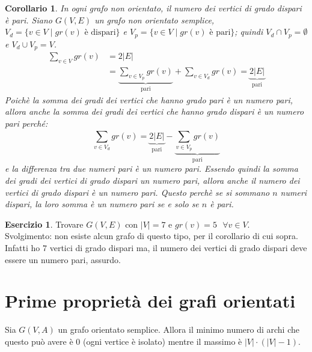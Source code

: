 \documentclass[a4paper, oneside, openany]{book}
\theoremstyle{plain}
\newtheorem{cor}[thm]{Corollario}
\theoremstyle{definition}
\newtheorem{eser}{Esercizio}[section]
\begin{document}
\begin{cor}
    In ogni grafo non orientato, il numero dei vertici di grado dispari è pari.
\proof
    Siano $G(V,E)$ un grafo non orientato semplice, ${V_d = \{v \in V \mid gr(v) \text{ è dispari}\}}$ e
    ${V_p = \{v \in V \mid gr(v) \text{ è pari}\}}$; quindi ${V_d \cap V_p = \emptyset}$ e 
    ${V_d \cup V_p = V}$.
    \begin{equation*}
    \begin{split}
        \sum_{v \in V}^{} gr(v) & = 
        2|E| \\ & = 
        \underbrace{{\sum_{v \in V_p}^{} gr(v)}}_{\text{pari}} + {\sum_{v \in V_d}^{} gr(v)} = 
        \underbrace{2|E|}_{\text{pari}}
    \end{split}
    \end{equation*}
    Poichè la somma dei gradi dei vertici che hanno grado pari è un numero pari, 
    allora anche la somma dei gradi dei vertici che hanno grado dispari è un numero pari perché:
    \[
        {\sum_{v \in V_d}^{} gr(v)} = \underbrace{2|E|}_{\text{pari}} - 
                \underbrace{{\sum_{v \in V_p}^{} gr(v)}}_{\text{pari}}
    \]
    e la differenza tra due numeri pari è un numero pari. Essendo quindi la somma dei gradi dei vertici
    di grado dispari un numero pari, allora anche il numero dei vertici di grado dispari è un numero
    pari. Questo perchè se si sommano $n$ numeri dispari, la loro somma è un numero pari 
    se e solo se $n$ è pari.
\endproof
\end{cor}

\begin{eser}
    Trovare $G(V,E)$ con $|V| = 7$ e ${gr(v) = 5 \text{ } \forall v \in V}$.\\
    Svolgimento: non esiste alcun grafo di questo tipo, per il corollario di cui sopra.
    Infatti ho $7$ vertici di grado dispari ma, il numero dei vertici di grado dispari
    deve essere un numero pari, assurdo.%
\end{eser}




\section{Prime proprietà dei grafi orientati}
Sia $G(V,A)$ un grafo orientato semplice. Allora il minimo numero di archi che questo può
avere è $0$ (ogni vertice è isolato) mentre il massimo è ${|V| \cdot (|V|-1)}$.
\end{document}
